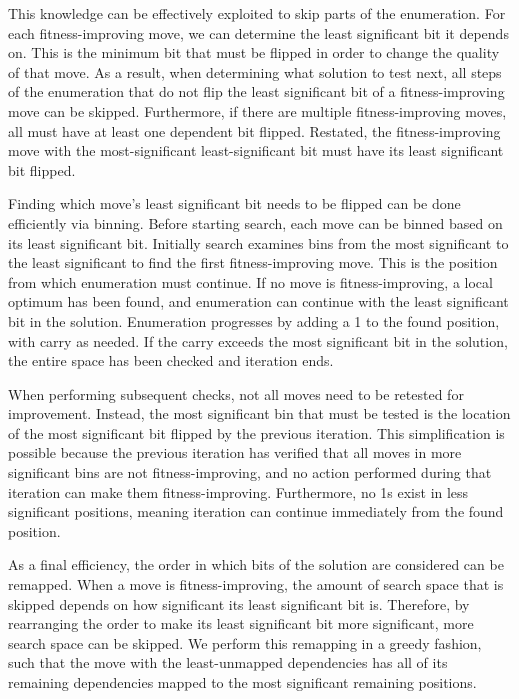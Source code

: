 This knowledge can be effectively exploited to skip parts of the enumeration.
For each fitness-improving move, we can determine the least
significant bit it depends on.
This is the minimum bit that must be flipped in order to change
the quality of that move. As a result, when determining what solution to test next, all steps
of the enumeration that do not flip the least significant bit of a fitness-improving move
can be skipped. Furthermore, if there are multiple fitness-improving moves, all must
have at least one dependent bit flipped. Restated, the fitness-improving move
with the most-significant least-significant bit must have its least significant bit flipped.


Finding which move's least significant bit needs to be flipped can be done efficiently via binning.
Before starting search, each move can be binned based on its least significant bit. Initially
search examines bins from the most significant to the least significant to find the first fitness-improving move.
This is the position from which enumeration must continue. If no move is fitness-improving, a local
optimum has been found, and enumeration can continue with the least significant bit in the solution.
Enumeration progresses by adding a 1 to the found position, with carry as needed.
If the carry exceeds the most significant bit in the solution, the entire space has been checked and iteration ends.

When performing subsequent checks, not all moves need to be retested for improvement. Instead, the most significant
bin that must be tested is the location of the most significant bit flipped by the previous iteration. This
simplification is possible because
the previous iteration has verified that all moves in more significant bins are not fitness-improving, and no action performed during
that iteration can make them fitness-improving. Furthermore, no 1s exist in less significant positions, meaning
iteration can continue immediately from the found position.

As a final efficiency, the order in which bits of the solution are considered can be remapped. When a move is fitness-improving,
the amount of search space that is skipped depends on how significant its least significant bit is. Therefore,
by rearranging the order to make its least significant bit more significant, more search space can be skipped. We perform
this remapping in a greedy fashion, such that the move with the least-unmapped dependencies has all of its remaining dependencies
mapped to the most significant remaining positions.

